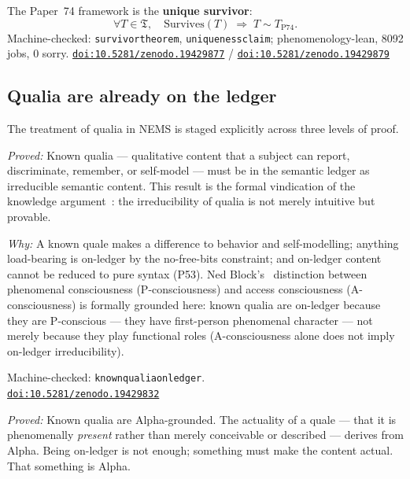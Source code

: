 \documentclass[11pt]{article}
\theoremstyle{remark}
\newcommand{\lean}[1]{%
  \penalty-100
  \begingroup\def\_{\textunderscore\allowbreak}\texttt{#1}\endgroup}
\newcommand{\doi}[1]{\href{https://doi.org/#1}{\nolinkurl{doi:#1}}}
\begin{document}
\medskip
The Paper~74 framework is the \textbf{unique survivor}:
\[
  \forall T \in \mathfrak{T},\quad \mathrm{Survives}(T) \;\Rightarrow\; T \sim T_{\text{P74}}.
\]
Machine-checked: \lean{survivor\_theorem}, \lean{uniqueness\_claim}; phenomenology-lean,
8092 jobs, 0 sorry. \doi{10.5281/zenodo.19429877} / \doi{10.5281/zenodo.19429879}

\subsection{Qualia are already on the ledger}\label{sec:qualia}

The treatment of qualia in NEMS is staged explicitly across three levels of proof.

\medskip
\begin{termlist}
  \item[Stage~1 --- On-ledger and irreducible (P55~\cite{SpivackNEMS55})]
    \emph{Proved:} Known qualia --- qualitative content that a subject can report,
    discriminate, remember, or self-model --- must be in the semantic ledger as
    irreducible semantic content. This result is the formal vindication of the
    knowledge argument~\cite{Jackson1982}: the irreducibility of qualia is not
    merely intuitive but provable.

    \emph{Why:} A known quale makes a difference to behavior and self-modelling;
    anything load-bearing is on-ledger by the no-free-bits constraint; and on-ledger
    content cannot be reduced to pure syntax (P53).
    Ned Block's~\cite{Block1995} distinction between phenomenal consciousness
    (P-consciousness) and access consciousness (A-consciousness) is formally
    grounded here: known qualia are on-ledger because they are P-conscious --- they
    have first-person phenomenal character --- not merely because they play functional
    roles (A-consciousness alone does not imply on-ledger irreducibility).

    Machine-checked: \lean{known\_qualia\_on\_ledger}.\\
    \doi{10.5281/zenodo.19429832}

  \item[Stage~2 --- Alpha-grounded (P65~\cite{SpivackNEMS65})]
    \emph{Proved:} Known qualia are Alpha-grounded. The actuality of a quale --- that
    it is phenomenally \emph{present} rather than merely conceivable or described ---
    derives from Alpha. Being on-ledger is not enough; something must make the content
    actual. That something is Alpha.


\end{termlist}
\end{document}
